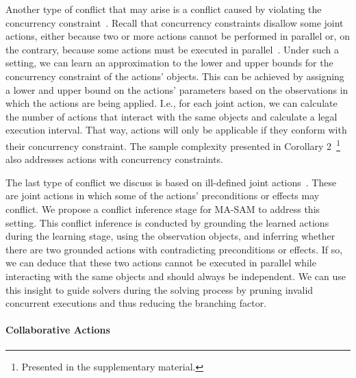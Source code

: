 \documentclass[letterpaper]{article} %
\theoremstyle{definition}
\theoremstyle{remark}
\newcommand{\masam}{\ac{MA-SAM}\xspace}
\begin{document}
Another type of conflict that may arise is a conflict caused by violating the concurrency constraint~\cite{boutilier2001partial}. Recall that concurrency constraints disallow some joint actions, either because two or more actions cannot be performed in parallel or, on the contrary, because some actions must be executed in parallel~\cite{boutilier2001partial,crosby2014single}. Under such a setting, we can learn an approximation to the lower and upper bounds for the concurrency constraint of the actions' objects. This can be achieved by assigning a lower and upper bound on the actions' parameters based on the observations in which the actions are being applied. I.e., for each joint action, we can calculate the number of actions that interact with the same objects and calculate a legal execution interval. That way, actions will only be applicable if they conform with their concurrency constraint. The sample complexity presented in Corollary 2~\footnote{Presented in the supplementary material.} also addresses actions with concurrency constraints.

The last type of conflict we discuss is based on ill-defined joint actions~\cite{boutilier2001partial}. 
These are joint actions in which some of the actions' preconditions or effects may conflict. We propose a conflict inference stage for \masam to address this setting. This conflict inference is conducted by grounding the learned actions during the learning stage, using the observation objects, and inferring whether there are two grounded actions with contradicting preconditions or effects. If so, we can deduce that these two actions cannot be executed in parallel while interacting with the same objects and should always be independent. We can use this insight to guide solvers during the solving process by pruning invalid concurrent executions and thus reducing the branching factor. 

\paragraph{Collaborative Actions}
\end{document}
